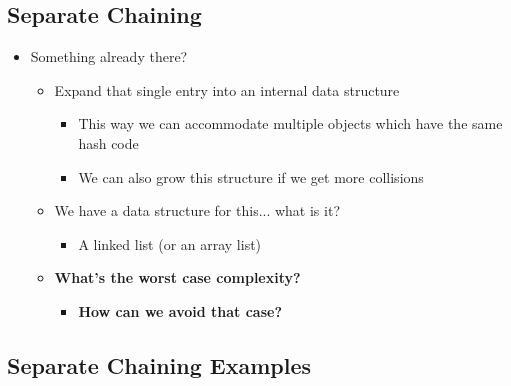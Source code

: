 \documentclass[10pt]{article}
\begin{document}
\subsection*{Separate Chaining}
\begin{itemize}
    \item Something already there?
    \begin{itemize}
        \item Expand that single entry into an internal data structure
        \begin{itemize}
            \item This way we can accommodate multiple objects which have the same hash code
            \item We can also grow this structure if we get more collisions
        \end{itemize}
        \item We have a data structure for this... what is it?
        \begin{itemize}
            \item A linked list (or an array list)
        \end{itemize}
        \item \textbf{What's the worst case complexity?}
        \begin{itemize}
            \item \textbf{How can we avoid that case?}
        \end{itemize}
    \end{itemize}
\end{itemize}

\subsection*{Separate Chaining Examples}
\end{document}
